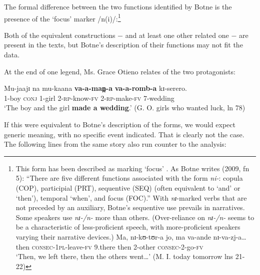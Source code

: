 \documentclass[output=paper]{langsci/langscibook}
\begin{document}
The formal difference between the two functions identified by Botne is the presence of the ‘focus’ marker /n(i)/:\footnote{This
 form has been described as marking ‘focus’ \citep{Dalgish1979,Nurse2006,Botne2009}. As Botne writes (2009, fn 5): “There are five different functions associated with the form \textit{ni-}: copula (COP), participial (PRT), sequentive (SEQ) (often equivalent to ‘and’ or ‘then’), temporal ‘when’, and focus (FOC).” With \textit{nɪ}-marked verbs that are not preceded by an auxiliary, Botne’s sequentive use prevails in  narratives. Some speakers use \textit{nɪ-/n-} more than others. (Over-reliance on \textit{nɪ-/n-} seems to be a characteristic of less-proficient speech, with more-proficient speakers varying their narrative devices.)  
  \ea
  \gll Ma,   nɪ-kʊ-tʊr-a     jo,  ma   va-ande     nɪ-va-zj-a…  \\
  then  \textsc{consec}-\textsc{1pl-}leave-\textsc{fv}  9.there  then  2-other    \textsc{consec}-2-go-\textsc{fv}\\
  \glt ‘Then, we left there, then the others went…’ (M. I. today tomorrow lns 21-22)
  \z
}


Both of the equivalent constructions $-$ and at least one other related one $-$ are present in the  texts, but Botne’s description of their functions may not fit the  data.

At the end of one legend, Ms. Grace Otieno relates of the two protagonists:

\ea\label{ex:sarvasy:26}
\gll Mu-jaajɪ   na   mu-kaana   \textbf{va-a-man̪-a}   \textbf{va-a-romb-a}     kɪ-serero. \\
1-boy    \textsc{conj}  1-girl    2-\textsc{rp}-know-\textsc{fv}  2-\textsc{rp}-make-\textsc{fv}  7-wedding \\
\glt ‘The boy and the girl \textbf{made a wedding}.’ (G. O. girls who wanted luck, ln 78)
\z

If this were equivalent to Botne’s description of the  forms, we would expect generic meaning, with no specific event indicated. That is clearly not the case. The following lines from the same  story also run counter to the  analysis: 
\end{document}
